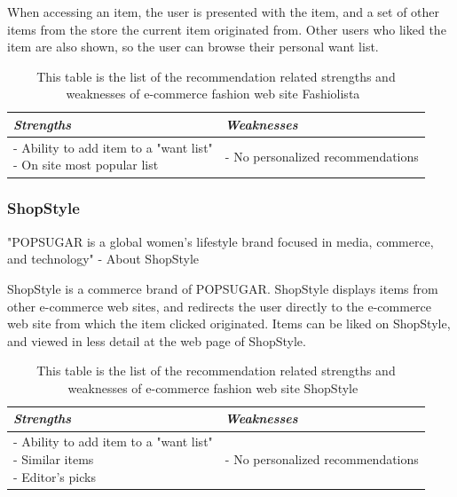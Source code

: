     When accessing an item, the user is presented with the item, and a set of other items from the store the current item originated from.
    Other users who liked the item are also shown, so the user can browse their personal want list.
    \begin{table}[H]
        \centering
        \begin{tabular}{l|l}
            \toprule
            \emph{Strengths} & \emph{Weaknesses} \\ \hline
            \pbox{9cm}{
                - Ability to add item to a "want list" \\
                - On site most popular list \\
            } & \pbox{9cm}{
                - No personalized recommendations \\
            } \\ \bottomrule
        \end{tabular}
        \caption[Recommendation related strengths and weaknesses of Fashiolista~\cite{Fashiolista}]{This table is the list of the recommendation related strengths and weaknesses of e-commerce fashion web site Fashiolista~\cite{Fashiolista}}
        \label{table:ecommenreceFahiolista}
    \end{table}

\subsubsection{ShopStyle} %
\label{par:shopstyle}
    "POPSUGAR is a global women's lifestyle brand focused in media, commerce, and technology" - About ShopStyle~\cite{ShopStyle}

    ShopStyle is a commerce brand of POPSUGAR.
    ShopStyle displays items from other e-commerce web sites, and redirects the user directly to the e-commerce web site from which the item clicked originated.
    Items can be liked on ShopStyle, and viewed in less detail at the web page of ShopStyle.
    \begin{table}[H]
        \centering
        \begin{tabular}{l|l}
            \toprule
            \emph{Strengths} & \emph{Weaknesses} \\ \hline
            \pbox{9cm}{
                - Ability to add item to a "want list" \\
                - Similar items \\
                - Editor's picks
            } & \pbox{9cm}{
                - No personalized recommendations \\
            } \\ \bottomrule
        \end{tabular}
        \caption[Recommendation related strengths and weaknesses of ShopStyle~\cite{ShopStyle}]{This table is the list of the recommendation related strengths and weaknesses of e-commerce fashion web site ShopStyle~\cite{ShopStyle}}
        \label{table:ecommenreceShopStyle}
    \end{table}

